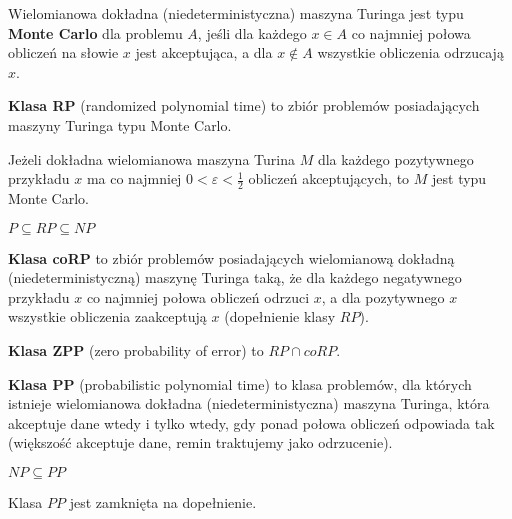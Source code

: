\begin{definicja}
    Wielomianowa dokładna (niedeterministyczna) maszyna Turinga jest typu
    \textbf{Monte Carlo} dla problemu $A$, jeśli dla każdego $x \in A$ co najmniej
    połowa obliczeń na słowie $x$ jest akceptująca, a dla $x \notin A$
    wszystkie obliczenia odrzucają $x$.
\end{definicja}

\begin{definicja}
    \textbf{Klasa RP} (randomized polynomial time) to zbiór problemów posiadających
    maszyny Turinga typu Monte Carlo.
\end{definicja}

\begin{lemat}
    Jeżeli dokładna wielomianowa maszyna Turina $M$ dla każdego pozytywnego przykładu $x$
    ma co najmniej $0 < \varepsilon < \frac{1}{2}$ obliczeń akceptujących, to $M$ jest typu Monte Carlo.
\end{lemat}

\begin{lemat}
    $P \subseteq RP \subseteq NP$
\end{lemat}

\begin{definicja}
    \textbf{Klasa coRP} to zbiór problemów posiadających wielomianową dokładną (niedeterministyczną)
    maszynę Turinga taką, że dla każdego negatywnego przykładu $x$ co najmniej połowa obliczeń odrzuci $x$,
    a dla pozytywnego $x$ wszystkie obliczenia zaakceptują $x$ (dopełnienie klasy $RP$).
\end{definicja}

\begin{definicja}
    \textbf{Klasa ZPP} (zero probability of error) to $RP \cap coRP$.
\end{definicja}

\begin{definicja}
    \textbf{Klasa PP} (probabilistic polynomial time) to klasa problemów, dla których istnieje wielomianowa
    dokładna (niedeterministyczna) maszyna Turinga, która akceptuje dane wtedy i tylko wtedy,
    gdy ponad połowa obliczeń odpowiada tak (większość akceptuje dane, remin traktujemy jako odrzucenie).
\end{definicja}

\begin{twierdzenie}
    $NP \subseteq PP$
\end{twierdzenie}

\begin{lemat}
    Klasa $PP$ jest zamknięta na dopełnienie.
\end{lemat}


